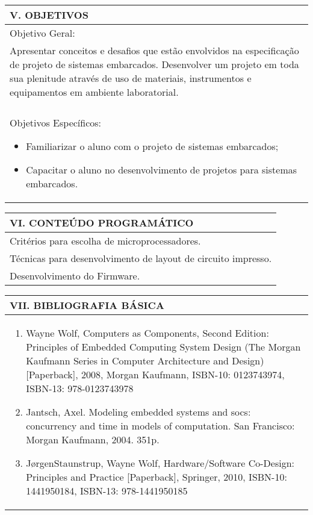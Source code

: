 \documentclass[12pt]{article}
\begin{document}
\begin{longtable}{|L{1.025\textwidth}|} \hline
%
{\bf V. OBJETIVOS } \\ \hline
%
Objetivo Geral: \\
Apresentar conceitos e desafios que estão envolvidos na especificação de projeto de sistemas embarcados. Desenvolver um projeto em toda sua plenitude através de uso de materiais, instrumentos e equipamentos em ambiente laboratorial.\\
\\
Objetivos Específicos:
\begin{itemize}
\item Familiarizar o aluno com o projeto de sistemas embarcados;
\item Capacitar o aluno no desenvolvimento de projetos para sistemas embarcados.
\end{itemize}
\\ \hline
\end{longtable}


\begin{longtable}{|L{1.025\textwidth}|} \hline
%
{\bf VI. CONTEÚDO PROGRAMÁTICO } \\ \hline
Critérios para escolha de microprocessadores.\\
Técnicas para desenvolvimento de layout de circuito impresso.\\
Desenvolvimento do Firmware.
\\ \hline
\end{longtable} 


\begin{longtable}{|L{1.025\textwidth}|} \hline
%
{\bf VII. BIBLIOGRAFIA BÁSICA} \\ \hline
\begin{enumerate}
%
\item Wayne Wolf, Computers as Components, Second Edition: Principles of Embedded Computing System Design (The Morgan Kaufmann Series in Computer Architecture and Design) [Paperback], 2008, Morgan Kaufmann, ISBN-10: 0123743974, ISBN-13: 978-0123743978 
\item Jantsch, Axel. Modeling embedded systems and socs: concurrency and time in models of computation. San Francisco: Morgan Kaufmann, 2004. 351p. 
\item JørgenStaunstrup, Wayne Wolf, Hardware/Software Co-Design: Principles and Practice [Paperback], Springer, 2010, ISBN-10: 1441950184, ISBN-13: 978-1441950185
\end{enumerate}
 \\ \hline
\end{longtable}
\end{document}
